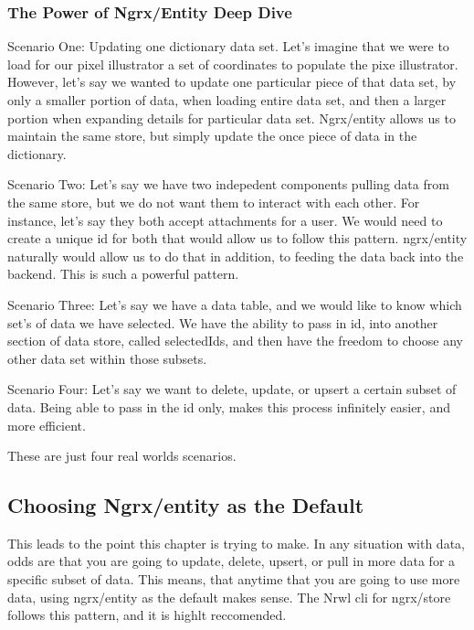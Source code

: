 \subsubsection{The Power of Ngrx/Entity Deep Dive}
Scenario One:
Updating one dictionary data set. Let's imagine that we were to load for our
pixel illustrator a set of coordinates to populate the pixe illustrator. However,
let's say we wanted to update one particular piece of that data set, by only
a smaller portion of data, when loading entire data set, and then a larger portion
when expanding details for particular data set. Ngrx/entity allows us to maintain
the same store, but simply update the once piece of data in the dictionary.

Scenario Two:
Let's say we have two indepedent components pulling data from the same store,
but we do not want them to interact with each other. For instance, let's say they
both accept attachments for a user. We would need to create a unique id for both
that would allow us to follow this pattern. ngrx/entity naturally would allow us
to do that in addition, to feeding the data back into the backend. This is such a
powerful pattern.

Scenario Three:
Let's say we have a data table, and we would like to know which set's of data
we have selected. We have the ability to pass in id, into another section of
data store, called selectedIds, and then have the freedom to choose any other
data set within those subsets.

Scenario Four:
Let's say we want to delete, update, or upsert a certain subset of data. Being
able to pass in the id only, makes this process infinitely easier, and more
efficient.

These are just four real worlds scenarios.

\subsection{Choosing Ngrx/entity as the Default}
This leads to the point this chapter is trying to make. In any situation with
data, odds are that you are going to update, delete, upsert, or pull in more
data for a specific subset of data. This means, that anytime that you are going
to use more data, using ngrx/entity as the default makes sense. The Nrwl cli
for ngrx/store follows this pattern, and it is highlt reccomended.
